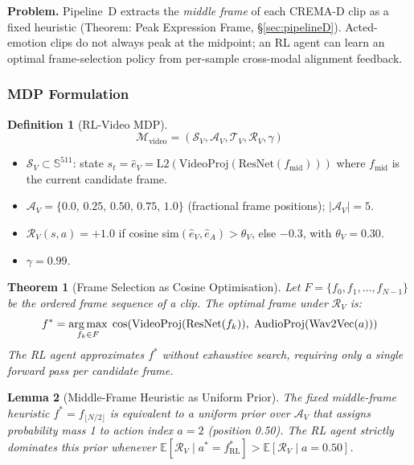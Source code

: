 \documentclass[12pt,a4paper]{article}
\theoremstyle{definition}
\newtheorem{definition}{Definition}[section]
\theoremstyle{plain}
\newtheorem{theorem}{Theorem}[section]
\newtheorem{lemma}[theorem]{Lemma}
\theoremstyle{remark}
\newcommand{\Sph}{\mathbb{S}}
\newcommand{\argmax}{\operatornamewithlimits{arg\,max}}
\newcommand{\EE}{\mathbb{E}}
\begin{document}
\begin{tcolorbox}[rlinjbox,title={Injection \textcircled{2} --- RL-Video}]
\textbf{Problem.}
Pipeline~D extracts the \emph{middle frame} of each CREMA-D clip as a fixed
heuristic (Theorem: Peak Expression Frame, \S\ref{sec:pipelineD}).
Acted-emotion clips do not always peak at the midpoint; an RL agent can learn
an optimal frame-selection policy from per-sample cross-modal alignment feedback.
\end{tcolorbox}

\subsubsection{MDP Formulation}

\begin{definition}[RL-Video MDP]
\label{def:rl_video_mdp}
\[
  \mathcal{M}_{\text{video}} = (\mathcal{S}_V,\mathcal{A}_V,\mathcal{T}_V,\mathcal{R}_V,\gamma)
\]
\begin{itemize}[nosep]
  \item $\mathcal{S}_V \subset \Sph^{511}$:
        state $s_t = \hat{e}_V = \mathrm{L2}(\text{VideoProj}(\text{ResNet}(f_{\text{mid}})))$
        where $f_{\text{mid}}$ is the current candidate frame.
  \item $\mathcal{A}_V = \{0.0,\,0.25,\,0.50,\,0.75,\,1.0\}$ (fractional frame positions);
        $|\mathcal{A}_V|=5$.
  \item $\mathcal{R}_V(s,a) = +1.0$ if cosine sim$(\hat{e}_V,\hat{e}_A) > \theta_V$,
        else $-0.3$, with $\theta_V = 0.30$.
  \item $\gamma = 0.99$.
\end{itemize}
\end{definition}

\begin{theorem}[Frame Selection as Cosine Optimisation]
\label{thm:frame_opt}
Let $F = \{f_0, f_{1}, \ldots, f_{N-1}\}$ be the ordered frame sequence of a clip.
The optimal frame under $\mathcal{R}_V$ is:
\[
  f^* = \argmax_{f_k \in F}\;
  \cos\!\left(\text{VideoProj}(\text{ResNet}(f_k)),\;
  \text{AudioProj}(\text{Wav2Vec}(a))\right)
\]
The RL agent approximates $f^*$ without exhaustive search, requiring only a single
forward pass per candidate frame.
\end{theorem}

\begin{lemma}[Middle-Frame Heuristic as Uniform Prior]
\label{lem:middle_prior}
The fixed middle-frame heuristic $f^*=f_{\lfloor N/2\rfloor}$ is equivalent to a
uniform prior over $\mathcal{A}_V$ that assigns probability mass 1 to action
index $a=2$ (position 0.50).  The RL agent strictly dominates this prior whenever
$\EE[\mathcal{R}_V \mid a^*=f^*_{\text{RL}}] > \EE[\mathcal{R}_V \mid a=0.50]$.
\end{lemma}
\end{document}
